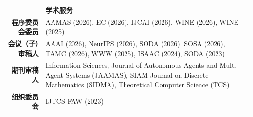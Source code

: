 \documentclass[UTF8, fontset=none, letterpaper, 11pt]{ctexart}
\newcommand{\headingfont}{\Large\bfseries\color{OliveGreen}}
\newenvironment{SectionTable}[1]{
  \renewcommand*{\arraystretch}{1.2}
  \setlength{\tabcolsep}{10pt}
  \begin{longtable}{Rp{5.2in}} & #1 \\}
{\end{longtable}\vspace{-1cm}}
\begin{document}
\begin{SectionTable}{\headingfont 学术服务}
\textbf{程序委员会委员} &
AAMAS (2026), EC (2026), IJCAI (2026), WINE (2026), WINE (2025)\\

\textbf{会议（子）审稿人} &
AAAI (2026), NeurIPS (2026), SODA (2026), SOSA (2026), TAMC (2026), WWW (2025), ISAAC (2024), SODA (2023)\\

\textbf{期刊审稿人} &
Information Sciences, Journal of Autonomous Agents and Multi-Agent Systems (JAAMAS), SIAM Journal on Discrete Mathematics (SIDMA), Theoretical Computer Science (TCS)\\

\textbf{组织委员会} &
IJTCS-FAW (2023)\\
\end{SectionTable}
\end{document}

